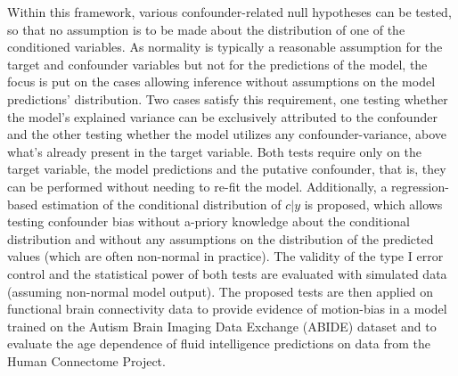 \documentclass{article}
\begin{document}
Within this framework, various confounder-related null hypotheses can be tested, so that no assumption is to be made about the distribution of one of the conditioned variables. As normality is typically a reasonable assumption for the target and confounder variables but not for the predictions of the model, the focus is put on the cases allowing inference without assumptions on the model predictions' distribution.
Two cases satisfy this requirement, one testing whether the model's explained variance can be exclusively attributed to the confounder and the other testing whether the model utilizes any confounder-variance, above what's already present in the target variable.
Both tests require only on the target variable, the model predictions and the putative confounder, that is, they can be performed without needing to re-fit the model.
Additionally, a regression-based estimation of the conditional distribution of $c|y$ is proposed, which allows testing confounder bias without a-priory knowledge about the conditional distribution and without any assumptions on the distribution of the predicted values (which are often non-normal in practice).
The validity of the type I error control and the statistical power of both tests are evaluated with simulated data (assuming non-normal model output).
The proposed tests are then applied on functional brain connectivity data to provide evidence of motion-bias in a model trained on the Autism Brain Imaging Data Exchange (ABIDE) dataset \citep{di2014autism} and to evaluate the age dependence of fluid intelligence predictions on data from the Human Connectome Project.
\end{document}
